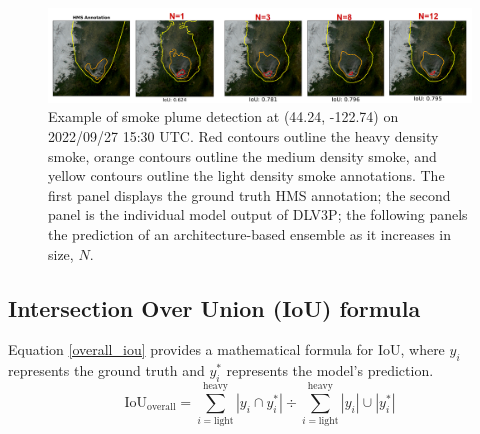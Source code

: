 \documentclass{article}
\begin{document}
\begin{figure}[h]
    \centering
    \includegraphics[width=\textwidth]{smoothing_ex.png}
    \caption{Example of smoke plume detection at (44.24, -122.74) on 2022/09/27 15:30 UTC. Red contours outline the heavy density smoke, orange contours outline the medium density smoke, and yellow contours outline the light density smoke annotations. The first panel displays the ground truth HMS annotation; the second panel is the individual model output of DLV3P; the following panels the prediction of an architecture-based ensemble as it increases in size, $N$.}
    \label{fig:smoothing_ex}
\end{figure}

\subsection{Intersection Over Union (IoU) formula}
Equation \ref{overall_iou} provides a mathematical formula for IoU, where $y_{i}$ represents the ground truth and $y^*_{i}$ represents the model's prediction.
\begin{equation} \label{overall_iou}
    \text{IoU}_{\text{overall}} = {\sum\limits_{i=\text{light}}^{\text{heavy}}|y_{i}\cap y^*_{i}|} \div {\sum\limits_{i=\text{light}}^{\text{heavy}}|y_{i}|\cup|y^*_{i}|}
\end{equation}




\end{document}
